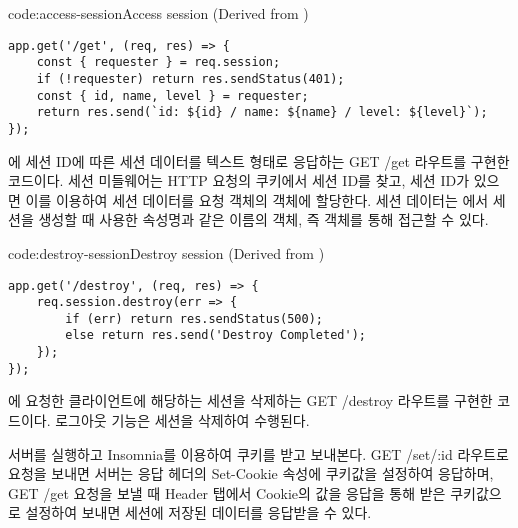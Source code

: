 \begin{code}{code:access-session}{Access session (Derived from )}
\begin{verbatim}
app.get('/get', (req, res) => {
    const { requester } = req.session;
    if (!requester) return res.sendStatus(401);
    const { id, name, level } = requester;
    return res.send(`id: ${id} / name: ${name} / level: ${level}`);
});
\end{verbatim}
\end{code}

\은 에 세션 ID에 따른 세션 데이터를 텍스트 형태로 응답하는 GET /get 라우트를 구현한 코드이다. 세션 미들웨어는 HTTP 요청의 쿠키에서 세션 ID를 찾고, 세션 ID가 있으면 이를 이용하여 세션 데이터를 요청 객체의  객체에 할당한다. 세션 데이터는 에서 세션을 생성할 때 사용한 속성명과 같은 이름의 객체, 즉  객체를 통해 접근할 수 있다.

\begin{code}{code:destroy-session}{Destroy session (Derived from )}
\begin{verbatim}
app.get('/destroy', (req, res) => {
    req.session.destroy(err => {
        if (err) return res.sendStatus(500);
        else return res.send('Destroy Completed');
    });
});
\end{verbatim}
\end{code}

\은 에 요청한 클라이언트에 해당하는 세션을 삭제하는 GET /destroy 라우트를 구현한 코드이다. 로그아웃 기능은 세션을 삭제하여 수행된다.


서버를 실행하고 Insomnia를 이용하여 쿠키를 받고 보내본다. GET /set/:id 라우트로 요청을 보내면 서버는 응답 헤더의 Set-Cookie 속성에 쿠키값을 설정하여 응답하며, GET /get 요청을 보낼 때 Header 탭에서 Cookie의 값을 응답을 통해 받은 쿠키값으로 설정하여 보내면 세션에 저장된 데이터를 응답받을 수 있다.


